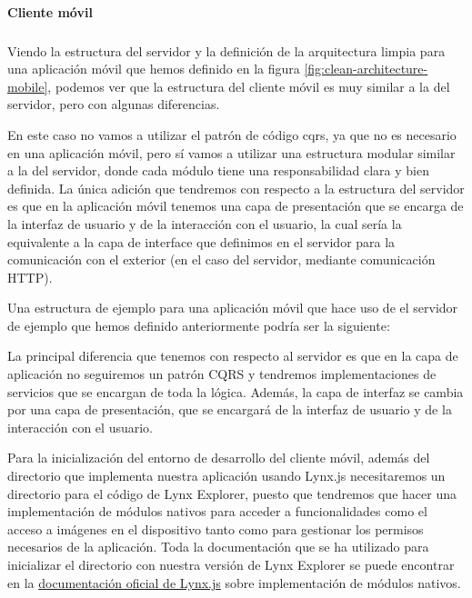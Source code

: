 \paragraph{Cliente móvil}
\subparagraph{}
Viendo la estructura del servidor y la definición de la arquitectura limpia para una aplicación móvil que hemos definido en la figura \ref{fig:clean-architecture-mobile}, podemos ver que la estructura del cliente móvil es muy similar a la del servidor, pero con algunas diferencias.

En este caso no vamos a utilizar el patrón de código \acrshort{cqrs}, ya que no es necesario en una aplicación móvil, pero sí vamos a utilizar una estructura modular similar a la del servidor, donde cada módulo tiene una responsabilidad clara y bien definida.
La única adición que tendremos con respecto a la estructura del servidor es que en la aplicación móvil tenemos una capa de presentación que se encarga de la interfaz de usuario y de la interacción con el usuario, la cual sería la equivalente a la capa de interface que definimos en el servidor para la comunicación con el exterior (en el caso del servidor, mediante comunicación HTTP).

Una estructura de ejemplo para una aplicación móvil que hace uso de el servidor de ejemplo que hemos definido anteriormente podría ser la siguiente:


La principal diferencia que tenemos con respecto al servidor es que en la capa de aplicación no seguiremos un patrón CQRS y tendremos implementaciones de servicios que se encargan de toda la lógica.
Además, la capa de interfaz se cambia por una capa de presentación, que se encargará de la interfaz de usuario y de la interacción con el usuario.

Para la inicialización del entorno de desarrollo del cliente móvil, además del directorio que implementa nuestra aplicación usando Lynx.js necesitaremos un directorio para el código de Lynx Explorer, puesto que tendremos que hacer una implementación de módulos nativos para acceder a funcionalidades como el acceso a imágenes en el dispositivo tanto como para gestionar los permisos necesarios de la aplicación.
Toda la documentación que se ha utilizado para inicializar el directorio con nuestra versión de Lynx Explorer se puede encontrar en la \href{https://lynxjs.org/guide/use-native-modules.html#platform=android}{documentación oficial de Lynx.js} sobre implementación de módulos nativos.

